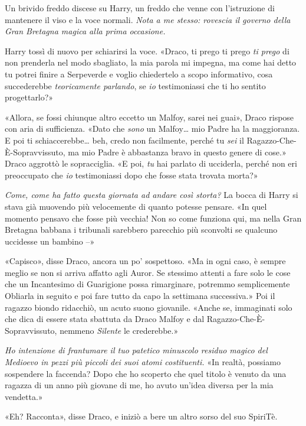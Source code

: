 Un brivido freddo discese su Harry, un freddo che venne con l’istruzione di mantenere il viso e la voce normali. \textit{Nota a me stesso: rovescia il governo della Gran Bretagna magica alla prima occasione.}

Harry tossì di nuovo per schiarirsi la voce. «Draco, ti prego ti prego \textit{ti prego} di non prenderla nel modo sbagliato, la mia parola mi impegna, ma come hai detto tu potrei finire a Serpeverde e voglio chiedertelo a scopo informativo, cosa succederebbe \textit{teoricamente parlando}, se \textit{io} testimoniassi che ti ho sentito progettarlo?»

«Allora, se fossi chiunque altro eccetto un Malfoy, sarei nei guai», Draco rispose con aria di sufficienza. «Dato che \textit{sono} un Malfoy… mio Padre ha la maggioranza. E poi ti schiaccerebbe… beh, credo non facilmente, perché tu \textit{sei} il Ragazzo-Che-È-Sopravvissuto, ma mio Padre è abbastanza bravo in questo genere di cose.» Draco aggrottò le sopracciglia. «E poi, \textit{tu} hai parlato di ucciderla, perché non eri preoccupato che \textit{io} testimoniassi dopo che fosse stata trovata morta?»

\textit{Come, come ha fatto questa giornata ad andare così storta?} La bocca di Harry si stava già muovendo più velocemente di quanto potesse pensare. «In quel momento pensavo che fosse più vecchia! Non so come funziona qui, ma nella Gran Bretagna babbana i tribunali sarebbero parecchio più sconvolti se qualcuno uccidesse un bambino –»

«Capisco», disse Draco, ancora un po’ sospettoso. «Ma in ogni caso, è sempre meglio se non si arriva affatto agli Auror. Se stessimo attenti a fare solo le cose che un Incantesimo di Guarigione possa rimarginare, potremmo semplicemente Obliarla in seguito e poi fare tutto da capo la settimana successiva.» Poi il ragazzo biondo ridacchiò, un acuto suono giovanile. «Anche se, immaginati solo che dica di essere stata sbattuta da Draco Malfoy e dal Ragazzo-Che-È-Sopravvissuto, nemmeno \textit{Silente} le crederebbe.»

\textit{Ho intenzione di frantumare il tuo patetico minuscolo residuo magico del Medioevo in pezzi più piccoli dei suoi atomi costituenti.} «In realtà, possiamo sospendere la faccenda? Dopo che ho scoperto che quel titolo è venuto da una ragazza di un anno più giovane di me, ho avuto un’idea diversa per la mia vendetta.»

«Eh? Racconta», disse Draco, e iniziò a bere un altro sorso del suo SpiriTè.

